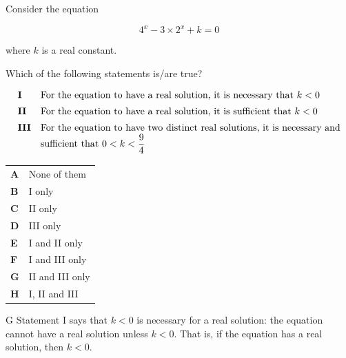\documentclass[11pt,a4paper]{article}
\begin{document}
\begin{enumerate}[label=\textbf{\arabic*.},leftmargin=*,itemsep=0pt,start=3]
\questionitem[Logic]
Consider the equation

\[
4^x - 3 \times 2^x + k = 0
\]

where $k$ is a real constant.

Which of the following statements is/are true?

\[
\begin{array}{@{}ll@{}}
\textbf{I} & \text{For the equation to have a real solution, it is necessary that } k < 0 \\[5pt]
\textbf{II} & \text{For the equation to have a real solution, it is sufficient that } k < 0 \\[5pt]
\textbf{III} & \text{For the equation to have two distinct real solutions, it is necessary and} \\
& \text{sufficient that } 0 < k < \dfrac{9}{4} \\[5pt]
\end{array}
\]

\par\vspace*{12pt}
\begin{tabularx}{\linewidth}{@{}>{\bfseries}l Y@{}}
A &
None of them
\\[0.8em]
B &
I only
\\[0.8em]
C &
II only
\\[0.8em]
D &
III only
\\[0.8em]
E &
I and II only
\\[0.8em]
F &
I and III only
\\[0.8em]
G &
II and III only
\\[0.8em]
H &
I, II and III
\\
\end{tabularx}

\begin{djsSolution}{G}
Statement I says that $k<0$ is necessary for a real solution: the equation cannot have a real solution unless $k<0$. That is, if the equation has a real solution, then $k<0$.


\end{djsSolution}
\end{enumerate}
\end{document}
